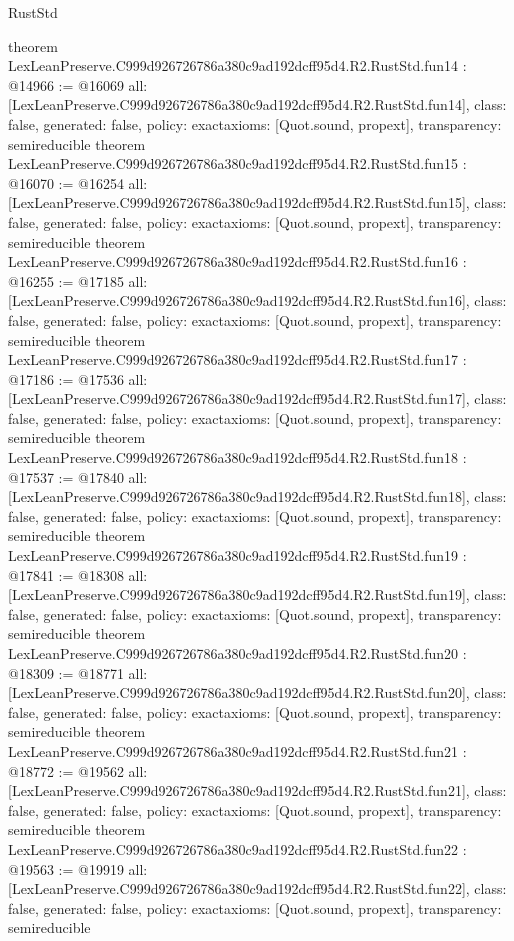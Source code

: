 \begin{lexlean}{RustStd}
\begin{coremodule}
{}
theorem LexLeanPreserve.C999d926726786a380c9ad192dcff95d4.R2.RustStd.fun14 : @14966 := @16069 {
  all: [LexLeanPreserve.C999d926726786a380c9ad192dcff95d4.R2.RustStd.fun14],
  class: false,
  generated: false,
  policy: exact{axioms: [Quot.sound, propext]},
  transparency: semireducible
}
theorem LexLeanPreserve.C999d926726786a380c9ad192dcff95d4.R2.RustStd.fun15 : @16070 := @16254 {
  all: [LexLeanPreserve.C999d926726786a380c9ad192dcff95d4.R2.RustStd.fun15],
  class: false,
  generated: false,
  policy: exact{axioms: [Quot.sound, propext]},
  transparency: semireducible
}
theorem LexLeanPreserve.C999d926726786a380c9ad192dcff95d4.R2.RustStd.fun16 : @16255 := @17185 {
  all: [LexLeanPreserve.C999d926726786a380c9ad192dcff95d4.R2.RustStd.fun16],
  class: false,
  generated: false,
  policy: exact{axioms: [Quot.sound, propext]},
  transparency: semireducible
}
theorem LexLeanPreserve.C999d926726786a380c9ad192dcff95d4.R2.RustStd.fun17 : @17186 := @17536 {
  all: [LexLeanPreserve.C999d926726786a380c9ad192dcff95d4.R2.RustStd.fun17],
  class: false,
  generated: false,
  policy: exact{axioms: [Quot.sound, propext]},
  transparency: semireducible
}
theorem LexLeanPreserve.C999d926726786a380c9ad192dcff95d4.R2.RustStd.fun18 : @17537 := @17840 {
  all: [LexLeanPreserve.C999d926726786a380c9ad192dcff95d4.R2.RustStd.fun18],
  class: false,
  generated: false,
  policy: exact{axioms: [Quot.sound, propext]},
  transparency: semireducible
}
theorem LexLeanPreserve.C999d926726786a380c9ad192dcff95d4.R2.RustStd.fun19 : @17841 := @18308 {
  all: [LexLeanPreserve.C999d926726786a380c9ad192dcff95d4.R2.RustStd.fun19],
  class: false,
  generated: false,
  policy: exact{axioms: [Quot.sound, propext]},
  transparency: semireducible
}
theorem LexLeanPreserve.C999d926726786a380c9ad192dcff95d4.R2.RustStd.fun20 : @18309 := @18771 {
  all: [LexLeanPreserve.C999d926726786a380c9ad192dcff95d4.R2.RustStd.fun20],
  class: false,
  generated: false,
  policy: exact{axioms: [Quot.sound, propext]},
  transparency: semireducible
}
theorem LexLeanPreserve.C999d926726786a380c9ad192dcff95d4.R2.RustStd.fun21 : @18772 := @19562 {
  all: [LexLeanPreserve.C999d926726786a380c9ad192dcff95d4.R2.RustStd.fun21],
  class: false,
  generated: false,
  policy: exact{axioms: [Quot.sound, propext]},
  transparency: semireducible
}
theorem LexLeanPreserve.C999d926726786a380c9ad192dcff95d4.R2.RustStd.fun22 : @19563 := @19919 {
  all: [LexLeanPreserve.C999d926726786a380c9ad192dcff95d4.R2.RustStd.fun22],
  class: false,
  generated: false,
  policy: exact{axioms: [Quot.sound, propext]},
  transparency: semireducible
}
\end{coremodule}
\end{lexlean}

